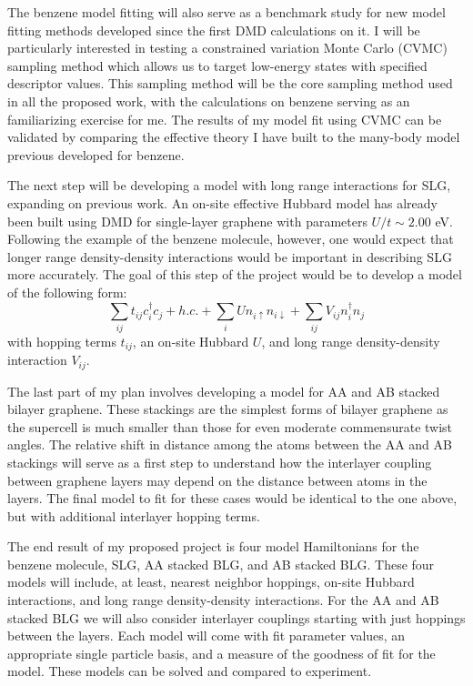 \documentclass[12pt]{article}
\begin{document}
The benzene model fitting will also serve as a benchmark study for new model fitting methods developed since the first DMD calculations on it.
I will be particularly interested in testing a constrained variation Monte Carlo (CVMC) sampling method which allows us to target low-energy states with specified descriptor values.
This sampling method will be the core sampling method used in all the proposed work, with the calculations on benzene serving as an familiarizing exercise for me.
The results of my model fit using CVMC can be validated by comparing the effective theory I have built to the many-body model previous developed for benzene.

The next step will be developing a model with long range interactions for SLG, expanding on previous work.
An on-site effective Hubbard model has already been built using DMD for single-layer graphene with parameters $U/t \sim 2.00$ eV.
Following the example of the benzene molecule, however, one would expect that longer range density-density interactions would be important in describing SLG more accurately.
The goal of this step of the project would be to develop a model of the following form:
\begin{equation}
\sum_{ij} t_{ij} c_i^\dagger c_j + h.c. +  \sum_i U n_{i\uparrow} n_{i\downarrow} + \sum_{ij} V_{ij} n_i^\dagger n_j
\end{equation}
with hopping terms $t_{ij}$, an on-site Hubbard $U$, and long range density-density interaction $V_{ij}$.

The last part of my plan involves developing a model for AA and AB stacked bilayer graphene.
These stackings are the simplest forms of bilayer graphene as the supercell is much smaller than those for even moderate commensurate twist angles.
The relative shift in distance among the atoms between the AA and AB stackings will serve as a first step to understand how the interlayer coupling between graphene layers may depend on the distance between atoms in the layers.
The final model to fit for these cases would be identical to the one above, but with additional interlayer hopping terms.

The end result of my proposed project is four model Hamiltonians for the  benzene molecule, SLG, AA stacked BLG, and AB stacked BLG.
These four models will include, at least, nearest neighbor hoppings, on-site Hubbard interactions, and long range density-density interactions.
For the AA and AB stacked BLG we will also consider interlayer couplings starting with just hoppings between the layers.
Each model will come with fit parameter values, an appropriate single particle basis, and a measure of the goodness of fit for the model.
These models can be solved and compared to experiment.
\end{document}
